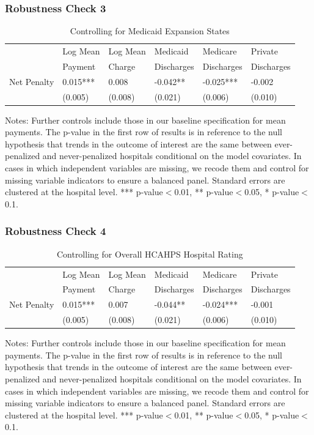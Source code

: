 \documentclass[ucs,9pt]{beamer}
\begin{document}
\begin{frame}
\frametitle{Robustness Check 3}
\begin{table}[htp]
\centering \normalsize
\caption{Controlling for Medicaid Expansion States}
\footnotesize
\begin{tabular}{llllll}
\hline	
\hline
 			& Log Mean 		& Log Mean	& Medicaid 	   	& Medicare   		& Private  			\\
			& Payment		& 	Charge	& Discharges      	& Discharges       	& Discharges    \\
\hline											
Net Penalty 	&	0.015***	&	0.008	&	-0.042**	&	-0.025***	&	-0.002	\\
	&	(0.005)	&	(0.008)	&	(0.021)	&	(0.006)	&	(0.010)	\\
	\hline
\end{tabular}
\end{table}
\tiny Notes: Further controls include those in our baseline specification for mean payments.  The p-value in the first row of results is in reference to the null hypothesis that trends in the outcome of interest are the same between ever-penalized and never-penalized hospitals conditional on the model covariates.  In cases in which independent variables are missing, we recode them and control for missing variable indicators to ensure a balanced panel.  Standard errors are clustered at the hospital level.  *** p-value$<$0.01, ** p-value$<$0.05, * p-value$<$0.1.
\end{frame}



\begin{frame}
\frametitle{Robustness Check 4}
\begin{table}[htp]
\centering \normalsize
\caption{Controlling for Overall HCAHPS Hospital Rating}
\footnotesize
\begin{tabular}{llllll}
\hline	
\hline
 			& Log Mean 		& Log Mean	& Medicaid 	   	& Medicare   		& Private  			\\
			& Payment		& 	Charge	& Discharges      	& Discharges       	& Discharges    \\
									
\hline											
Net Penalty 	&	0.015***	&	0.007	&	-0.044**	&	-0.024***	&	-0.001	\\
	&	(0.005)	&	(0.008)	&	(0.021)	&	(0.006)	&	(0.010)	\\
\end{tabular}
\end{table}
\tiny Notes: Further controls include those in our baseline specification for mean payments.  The p-value in the first row of results is in reference to the null hypothesis that trends in the outcome of interest are the same between ever-penalized and never-penalized hospitals conditional on the model covariates.  In cases in which independent variables are missing, we recode them and control for missing variable indicators to ensure a balanced panel.  Standard errors are clustered at the hospital level.  *** p-value$<$0.01, ** p-value$<$0.05, * p-value$<$0.1.
\end{frame}
\end{document}
